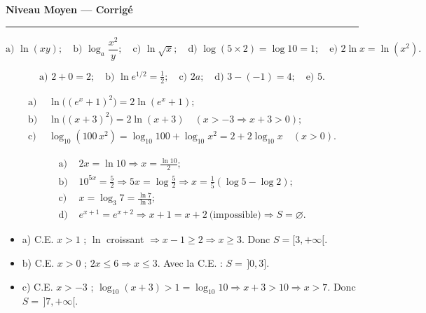 \documentclass[11pt,a4paper]{article}
\begin{document}
\begin{center}
{\LARGE\bfseries\color{primarydark} Niveau Moyen — Corrigé}\\[2pt]
{\color{primary}\rule{0.45\textwidth}{1.2pt}}
\end{center}
\vspace{1mm}

\begin{corrige}[condenser]
\[ \text{a) }\ln(xy);\quad \text{b) }\log_a\frac{x^{2}}{y};\quad \text{c) }\ln\sqrt{x};\quad
   \text{d) }\log(5\times 2)=\log 10=1;\quad \text{e) }2\ln x=\ln(x^{2}). \]
\end{corrige}

\begin{corrige}[simplifier]
\[ \text{a) }2+0=2;\quad \text{b) }\ln e^{1/2}=\tfrac12;\quad \text{c) }2a;\quad
   \text{d) }3-(-1)=4;\quad \text{e) }5. \]
\end{corrige}

\begin{corrige}
\begin{align*}
\text{a) }&\ln\bigl((e^{x}+1)^{2}\bigr)=2\ln(e^{x}+1);\\
\text{b) }&\ln\bigl((x+3)^{2}\bigr)=2\ln(x+3)\quad(x>-3\Rightarrow x+3>0);\\
\text{c) }&\log_{10}(100\,x^{2})=\log_{10}100+\log_{10}x^{2}=2+2\log_{10}x\quad(x>0).
\end{align*}
\end{corrige}

\begin{corrige}
\begin{align*}
\text{a) }&2x=\ln 10\Rightarrow x=\tfrac{\ln 10}{2};\\
\text{b) }&10^{5x}=\tfrac52\Rightarrow 5x=\log\tfrac52\Rightarrow x=\tfrac15(\log 5-\log 2);\\
\text{c) }&x=\log_3 7=\tfrac{\ln 7}{\ln 3};\\
\text{d) }&e^{x+1}=e^{x+2}\Rightarrow x+1=x+2\ \text{(impossible)}\Rightarrow S=\varnothing.
\end{align*}
\end{corrige}

\begin{corrige}
\begin{itemize}[leftmargin=1.4em,topsep=1pt,itemsep=1pt]
  \item a) C.E. $x>1$ ; $\ln$ croissant $\Rightarrow x-1\geq 2\Rightarrow x\geq 3$. Donc $S=[3,+\infty[$.
  \item b) C.E. $x>0$ ; $2x\leq 6\Rightarrow x\leq 3$. Avec la C.E. : $S=\,]0,3]$.
  \item c) C.E. $x>-3$ ; $\log_{10}(x+3)>1=\log_{10}10\Rightarrow x+3>10\Rightarrow x>7$. Donc $S=\,]7,+\infty[$.
\end{itemize}
\end{corrige}
\end{document}
